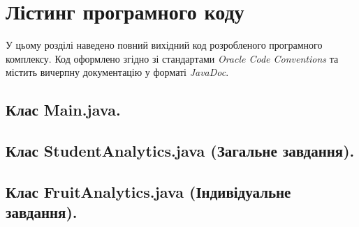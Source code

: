 \section{Лістинг програмного коду}

У цьому розділі наведено повний вихідний код розробленого програмного комплексу. 
Код оформлено згідно зі стандартами \textit{Oracle Code Conventions} та містить 
вичерпну документацію у форматі \textit{JavaDoc}.

\subsection{Клас Main.java.}

\newpage %
\subsection{Клас StudentAnalytics.java (Загальне завдання).}


\newpage %
\subsection{Клас FruitAnalytics.java (Індивідуальне завдання).}
